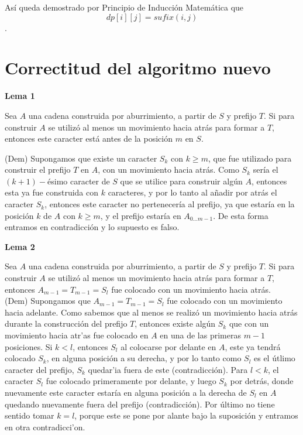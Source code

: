 \documentclass[a4paper]{article}
\begin{document}
	Así queda demostrado por Principio de Inducción Matemática que $$dp[i][j]=sufix(i,j)$$.
	
	\section*{Correctitud del algoritmo nuevo}
	
	\textbf{Lema 1}
	
	Sea $A$ una cadena construida por aburrimiento, a partir de $S$ y prefijo $T$. Si para construir $A$ se utiliz\'o al menos un movimiento hacia atr\'as para formar a $T$, entonces este caracter está antes de la posición $m$ en $S$.
	
	(Dem) Supongamos que existe un caracter $S_k$ con $k \ge m$, que fue utilizado para construir el prefijo $T$ en $A$, con un movimiento hacia atrás. Como $S_k$ sería el $(k+1)-$ésimo caracter de $S$ que se utilice para construir algún $A$, entonces esta ya fue construida con $k$ caracteres, y por lo tanto al añadir por atrás el caracter $S_k$, entonces este caracter no pertenecería al prefijo, ya que estaría en la posición $k$ de $A$ con $k \ge m$, y el prefijo estaría en $A_{0...m-1}$. De esta forma entramos en contradicción y lo supuesto es falso.	
	
	\textbf{Lema 2}
	
	Sea $A$ una cadena construida por aburrimiento, a partir de $S$ y prefijo $T$.
	Si para construir $A$ se utiliz\'o al menos un movimiento hacia atr\'as para formar a $T$,
	entonces $A_{m-1} = T_{m-1} = S_{l}$ fue colocado con un movimiento hacia atr\'as. \\
	
	(Dem) Supongamos que $A_{m-1} = T_{m-1} = S_{l}$ fue colocado con un movimiento hacia adelante.
	Como sabemos que al menos se realiz\'o un movimiento hacia atr\'as durante la construcci\'on
	del prefijo $T$, entonces existe alg\'un $S_{k}$ que con un movimiento hacia atr'as fue colocado
	en $A$ en una de las primeras $m-1$ posiciones. Si $k<l$, entonces $S_l$ al colocarse por delante
	en $A$, este ya tendr\'a colocado $S_k$, en alguna posici\'on a su derecha, y por lo tanto
	como $S_l$ es el \'utlimo caracter del prefijo, $S_k$ quedar'ia fuera de este (contradicci\'on).
	Para $l<k$, el caracter $S_l$ fue colocado primeramente por delante, y luego $S_k$ por detr\'as,
	donde nuevamente este caracter estar\'ia en alguna posici\'on a la derecha de $S_l$ en $A$
	quedando nuevamente fuera del prefijo (contradicci\'on).
	Por \'ultimo no tiene sentido tomar $k=l$, porque este se pone por alante bajo la suposici\'on
	y entramos en otra contradicci'on.\\
	
\end{document}
